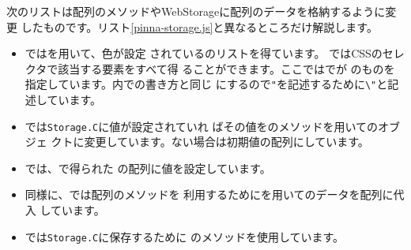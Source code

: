 次のリストは配列のメソッドやWebStorageに配列のデータを格納するように変更
したものです。リスト\ref{pinna-storage.js}と異なるところだけ解説します。
\begin{itemize}
 \item {}ではを用いて、色が設定
       されているのリストを得ています。
       ではCSSのセレクタで該当する要素をすべて得
       ることができます。ここではでが
       のものを指定しています。\HTML 内での書き方と同じ
       にするので\Verb+"+を記述するために\Verb+\"+と記述しています。%
 \item {}では\Verb+Storage.C+に値が設定されていれ
       ばその値をのメソッドを用いて\JS のオブジェ
       クトに変更しています。ない場合は初期値の配列にしています。
 \item {}では、で得られた
       の配列に値を設定しています。
 \item 同様に、では配列のメソッドを
       利用するためにを用いてのデータを配列に代入
       しています。
 \item {}では\Verb+Storage.C+に保存するために
       のメソッドを使用しています。
\end{itemize}